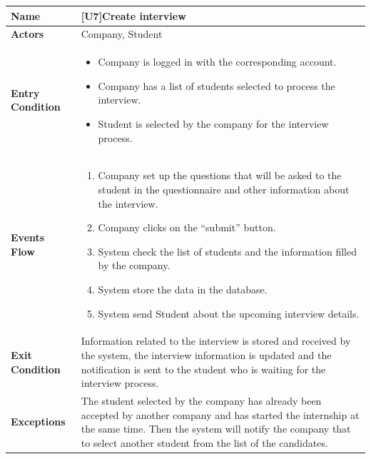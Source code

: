 \begin{center}
    \begin{tabular}{|p{9em}|p{27em}|}
        \hline
        \rowcolor{bluepoli!40} %
        \textbf{Name} & \textbf{[U7]Create interview} \\
        \hline
        \textbf{Actors} & Company, Student \\
        \hline
        \textbf{Entry Condition} & 
        \begin{itemize}
            \item Company is logged in with the corresponding account.
            \item Company has a list of students selected to process the interview.
            \item Student is selected by the company for the interview process.
        \end{itemize} \\
        \hline
        \textbf{Events Flow} & 
        \begin{enumerate}
            \item Company set up the questions that will be asked to the student in the questionnaire and other information about the interview.
            \item Company clicks on the ``submit'' button.
            \item System check the list of students and the information filled by the company.
            \item System store the data in the database.
            \item System send Student about the upcoming interview details.
        \end{enumerate} \\
        \hline
        \textbf{Exit Condition} & 
        Information related to the interview is stored and received by the system, the interview information is updated and the notification is 
        sent to the student who is waiting for the interview process.\\
        \hline
        \textbf{Exceptions} &
        The student selected by the company has already been accepted by another company and has started the internship at the same time.
        Then the system will notify the company that to select another student from the list of the candidates.\\
        \hline
    \end{tabular}
\end{center}

